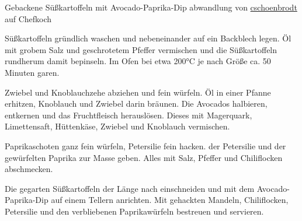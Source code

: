 \begin{recipe}[]{ Gebackene Süßkartoffeln mit Avocado-Paprika-Dip }{ abwandlung von \href{http://www.chefkoch.de/rezepte/2725361425059942/Gebackene-Suesskartoffeln-mit-Avocado-Paprika-Creme.html}{cschoenbrodt} auf Chefkoch }



\step
Süßkartoffeln gründlich waschen und nebeneinander auf ein Backblech legen.
Öl mit grobem Salz und geschrotetem Pfeffer vermischen und die Süßkartoffeln rundherum damit bepinseln.
Im Ofen bei etwa 200°C je nach Größe ca. 50 Minuten garen.

\step
Zwiebel und Knoblauchzehe abziehen und fein würfeln. Öl in einer Pfanne erhitzen, Knoblauch und Zwiebel darin bräunen.
Die Avocados halbieren, entkernen und das Fruchtfleisch herauslösen. Dieses mit Magerquark, Limettensaft,
Hüttenkäse, Zwiebel und Knoblauch vermischen.

\step
Paprikaschoten ganz fein würfeln, Petersilie fein hacken.  der Petersilie und der gewürfelten Paprika zur Masse geben. Alles mit Salz, Pfeffer und Chiliflocken abschmecken.

\step
Die gegarten Süßkartoffeln der Länge nach einschneiden und mit dem Avocado-Paprika-Dip auf einem Tellern anrichten. Mit gehackten Mandeln, Chiliflocken, Petersilie und den verbliebenen Paprikawürfeln bestreuen und servieren.



\end{recipe}
